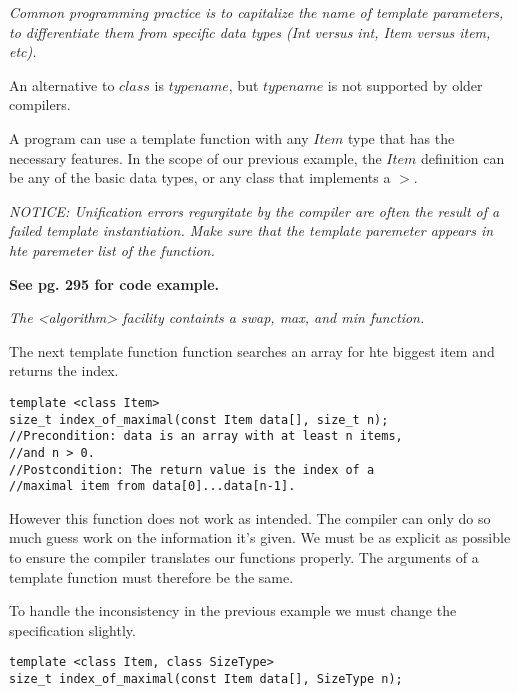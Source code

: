 \emph{Common programming practice is to capitalize the name of template parameters, to differentiate them from specific data types (Int versus int, Item versus item, etc).}

An alternative to $class$ is $typename$, but $typename$ is not supported by older compilers.

A program can use a template function with any $Item$ type that has the necessary features. In the scope of our previous example, the $Item$ definition can be any of the basic data types, or any class that implements a $>$.

\emph{NOTICE: Unification errors regurgitate by the compiler are often the result of a failed template instantiation. Make sure that the template paremeter appears in hte paremeter list of the function.}

\textbf{See pg. 295 for code example.}

\emph{The <algorithm> facility containts a swap, max, and min function.}

The next template function function searches an array for hte biggest item and returns the index.
\begin{lstlisting}[basicstyle=\ttfamily]
template <class Item>
size_t index_of_maximal(const Item data[], size_t n);
//Precondition: data is an array with at least n items, 
//and n > 0.
//Postcondition: The return value is the index of a 
//maximal item from data[0]...data[n-1].
\end{lstlisting}
However this function does not work as intended. The compiler can only do so much guess work on the information it's given. We must be as explicit as possible to ensure the compiler translates our functions properly. The arguments of a template function must therefore be the same.

To handle the inconsistency in the previous example we must change the specification slightly.
\begin{lstlisting}[basicstyle=\ttfamily]
template <class Item, class SizeType>
size_t index_of_maximal(const Item data[], SizeType n);
\end{lstlisting}

